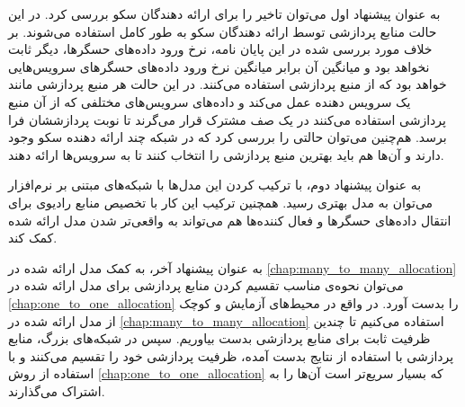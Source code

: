     به عنوان پیشنهاد اول می‌توان تاخیر را برای ارائه دهندگان سکو بررسی کرد.
    در این حالت منابع پردازشی توسط ارائه دهندگان سکو به طور کامل استفاده می‌شوند.
    بر خلاف مورد بررسی شده در این پایان نامه، نرخ ورود داده‌های حسگر‌ها، دیگر ثابت نخواهد بود و میانگین آن برابر میانگین نرخ ورود داده‌های حسگر‌های سرویس‌هایی خواهد بود که از منبع پردازشی استفاده می‌کنند.
    در این حالت هر منبع پردازشی مانند یک سرویس دهنده عمل می‌کند و داده‌های سرویس‌های مختلفی که از آن منبع پردازشی استفاده می‌کنند در یک صف مشترک قرار می‌گرند تا نوبت پردازششان فرا برسد.
    هم‌چنین می‌توان حالتی را بررسی کرد که در شبکه چند ارائه دهنده سکو وجود دارند و آن‌ها هم باید بهترین منبع پردازشی را انتخاب کنند تا به سرویس‌ها ارائه دهند.

    به عنوان پیشنهاد دوم، با ترکیب کردن این مدل‌ها با شبکه‌های مبتنی بر نرم‌افزار می‌توان به مدل بهتری رسید.
    همچنین ترکیب این کار با تخصیص منابع رادیوی برای انتقال داده‌های حسگر‌ها و فعال کننده‌ها هم می‌تواند به واقعی‌تر شدن مدل ارائه شده کمک کند.

    به عنوان پیشنهاد آخر، به کمک مدل ارائه شده در \cref{chap:many_to_many_allocation} می‌توان نحوه‌ی مناسب تقسیم کردن منابع پردازشی برای مدل ارائه شده در \cref{chap:one_to_one_allocation} را بدست آورد.
    در واقع در محیط‌های آزمایش و کوچک از مدل ارائه شده در \cref{chap:many_to_many_allocation} استفاده می‌کنیم تا چندین ظرفیت ثابت برای منابع پردازشی بدست بیاوریم. سپس در شبکه‌های بزرگ، منابع پردازشی با استفاده از نتایج بدست آمده، ظرفیت پردازشی خود را تقسیم می‌کنند و با استفاده از روش \cref{chap:one_to_one_allocation} که بسیار سریع‌تر است آن‌ها را به اشتراک می‌گذارند.
